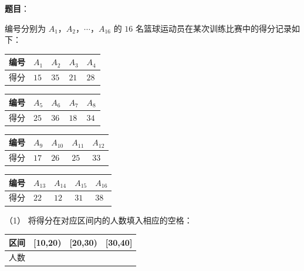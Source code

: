 \begin{answer}

\textbf{题目}：

编号分别为 $A_1$，$A_2$，$\cdots$，$A_{16}$ 的 $16$ 名篮球运动员在某次训练比赛中的得分记录如下：

\begin{center}
\begin{tabular}{lllll}
\toprule
编号 & $A_1$ & $A_2$ & $A_3$ & $A_4$ \\
\midrule
得分 & $15$ & $35$ & $21$ & $28$ \\
\bottomrule
\end{tabular}
\end{center}

\begin{center}
\begin{tabular}{lllll}
\toprule
编号 & $A_5$ & $A_6$ & $A_7$ & $A_8$ \\
\midrule
得分 & $25$ & $36$ & $18$ & $34$ \\
\bottomrule
\end{tabular}
\end{center}

\begin{center}
\begin{tabular}{lllll}
\toprule
编号 & $A_9$ & $A_{10}$ & $A_{11}$ & $A_{12}$ \\
\midrule
得分 & $17$ & $26$ & $25$ & $33$ \\
\bottomrule
\end{tabular}
\end{center}

\begin{center}
\begin{tabular}{lllll}
\toprule
编号 & $A_{13}$ & $A_{14}$ & $A_{15}$ & $A_{16}$ \\
\midrule
得分 & $22$ & $12$ & $31$ & $38$ \\
\bottomrule
\end{tabular}
\end{center}

（1） 将得分在对应区间内的人数填入相应的空格：

\begin{center}
\begin{tabular}{llll}
\toprule
区间 & [10,20) & [20,30) & [30,40] \\
\midrule
人数 &  &  &  \\
\bottomrule
\end{tabular}
\end{center}


\end{answer}
